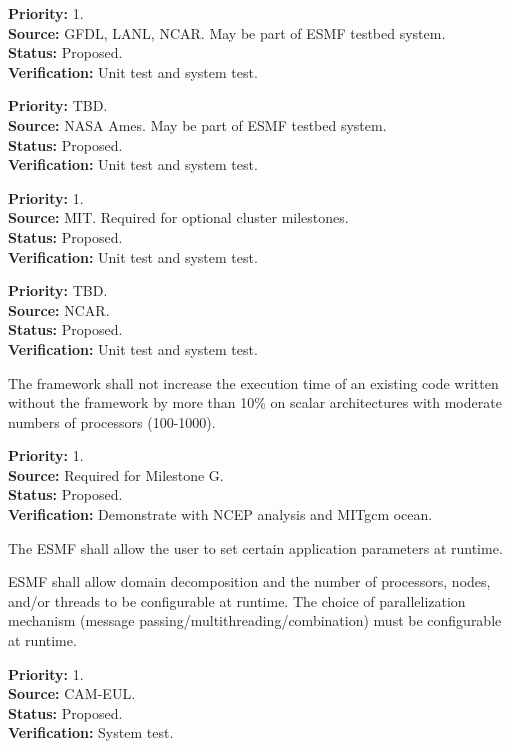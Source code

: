 \begin{reqlist}
{\bf Priority:} 1. \\
{\bf Source:} GFDL, LANL, NCAR.  May be part of ESMF testbed system. \\
{\bf Status:} Proposed. \\
{\bf Verification:} Unit test and system test.
\end{reqlist}

\begin{reqlist}
{\bf Priority:} TBD. \\
{\bf Source:} NASA Ames.  May be part of ESMF testbed system. \\
{\bf Status:} Proposed. \\
{\bf Verification:} Unit test and system test.
\end{reqlist}

\begin{reqlist}
{\bf Priority:} 1. \\
{\bf Source:} MIT.  Required for optional cluster milestones. \\
{\bf Status:} Proposed. \\
{\bf Verification:} Unit test and system test.
\end{reqlist}

\begin{reqlist}
{\bf Priority:} TBD. \\
{\bf Source:} NCAR. \\
{\bf Status:} Proposed. \\
{\bf Verification:} Unit test and system test.
\end{reqlist}

The framework shall not increase the execution time of an existing code 
written without the framework by more than 10\% on scalar 
architectures with moderate numbers of processors (100-1000).
\begin{reqlist}
{\bf Priority:} 1. \\
{\bf Source:} Required for Milestone G. \\
{\bf Status:} Proposed. \\
{\bf Verification:} Demonstrate with NCEP analysis and MITgcm ocean.
\end{reqlist}

The ESMF shall allow the user to set certain application parameters at runtime.

ESMF shall allow domain decomposition and the number of processors, 
nodes, and/or threads to be configurable at runtime.  The choice of
parallelization mechanism (message passing/multithreading/combination)
must be configurable at runtime.
\begin{reqlist}
{\bf Priority:} 1. \\
{\bf Source:} CAM-EUL. \\
{\bf Status:} Proposed. \\
{\bf Verification:} System test.
\end{reqlist}

